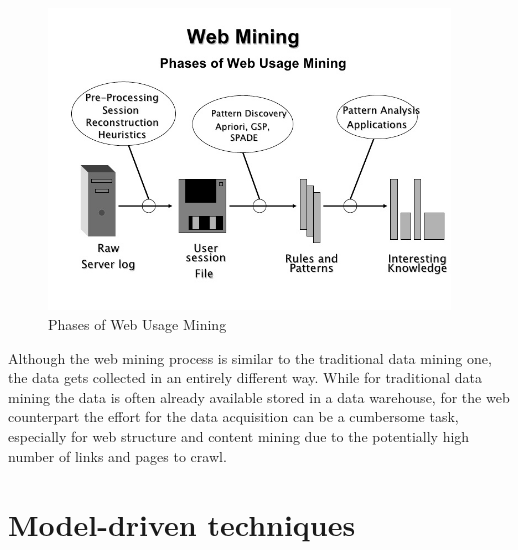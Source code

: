 \vspace{0.5cm}
\begin{figure}[!htbp]
  \centering
    \includegraphics[height=8cm]{images/webmining}
  \caption{Phases of Web Usage Mining}
  \label{fig:webmining}
\end{figure}
\vspace{0.5cm}


Although the web mining process is similar to the traditional data mining one, the data gets collected in an entirely different way. While for traditional data mining the data is often already available stored in a data warehouse, for the web counterpart the effort for the data acquisition can be a cumbersome task, especially for web structure and content mining due to the potentially high number of links and pages to crawl.

\section{Model-driven techniques}



